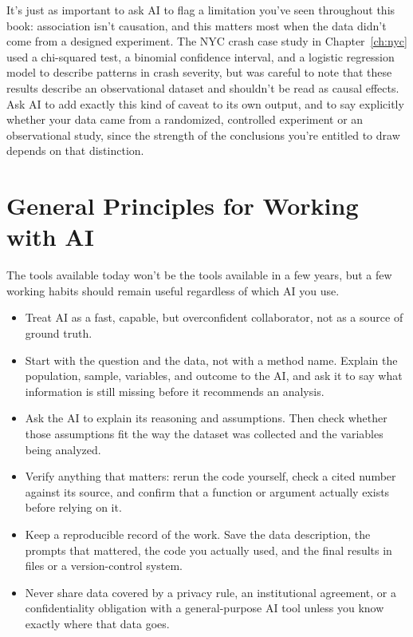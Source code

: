 It's just as important to ask AI to flag a limitation you've seen
throughout this book: association isn't causation, and this matters
most when the data didn't come from a designed experiment. The NYC
crash case study in Chapter~\ref{ch:nyc} used a chi-squared test, a
binomial confidence interval, and a logistic regression model to
describe patterns in crash severity, but was careful to note that
these results describe an observational dataset and shouldn't be read
as causal effects. Ask AI to add exactly this kind of caveat to its own
output, and to say explicitly whether your data came from a randomized,
controlled experiment or an observational study, since the strength of
the conclusions you're entitled to draw depends on that distinction.

\section{General Principles for Working with AI}

The tools available today won't be the tools available in a few
years, but a few working habits should remain useful regardless of
which AI you use.

\begin{itemize}
\item Treat AI as a fast, capable, but overconfident collaborator,
  not as a source of ground truth.
\item Start with the question and the data, not with a method name. Explain
  the population, sample, variables, and outcome to the AI, and ask it to say
  what information is still missing before it recommends an analysis.
\item Ask the AI to explain its reasoning and assumptions. Then check whether
  those assumptions fit the way the dataset was collected and the variables
  being analyzed.
\item Verify anything that matters: rerun the code yourself, check a cited
  number against its source, and confirm that a function or argument actually
  exists before relying on it.
\item Keep a reproducible record of the work. Save the data description, the
  prompts that mattered, the code you actually used, and the final results in
  files or a version-control system.
\item Never share data covered by a privacy rule, an institutional agreement,
  or a confidentiality obligation with a general-purpose AI tool unless you
  know exactly where that data goes.
\end{itemize}

